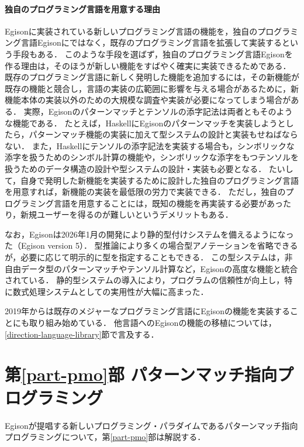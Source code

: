 \begin{oframed}
  \paragraph{独自のプログラミング言語を用意する理由}
Egisonに実装されている新しいプログラミング言語の機能を，独自のプログラミング言語Egisonにではなく，既存のプログラミング言語を拡張して実装するという手段もある．
このような手段を選ばず，独自のプログラミング言語Egisonを作る理由は，そのほうが新しい機能をすばやく確実に実装できるためである．
既存のプログラミング言語に新しく発明した機能を追加するには，その新機能が既存の機能と競合し，言語の実装の広範囲に影響を与える場合があるために，新機能本体の実装以外のための大規模な調査や実装が必要になってしまう場合がある．
実際，Egisonのパターンマッチとテンソルの添字記法は両者ともそのような機能である．
たとえば，HaskellにEgisonのパターンマッチを実装しようとしたら，パターンマッチ機能の実装に加えて型システムの設計と実装もせねばならない．
また，Haskellにテンソルの添字記法を実装する場合も，シンボリックな添字を扱うためのシンボル計算の機能や，シンボリックな添字をもつテンソルを扱うためのデータ構造の設計や型システムの設計・実装も必要となる．
たいして，自身で発明した新機能を実装するために設計した独自のプログラミング言語を用意すれば，新機能の実装を最低限の労力で実装できる．
ただし，独自のプログラミング言語を用意することには，既知の機能を再実装する必要があったり，新規ユーザーを得るのが難しいというデメリットもある．

なお，Egisonは2026年1月の開発により静的型付けシステムを備えるようになった（Egison version 5）．
型推論により多くの場合型アノテーションを省略できるが，必要に応じて明示的に型を指定することもできる．
この型システムは，非自由データ型のパターンマッチやテンソル計算など，Egisonの高度な機能と統合されている．
静的型システムの導入により，プログラムの信頼性が向上し，特に数式処理システムとしての実用性が大幅に高まった．

2019年からは既存のメジャーなプログラミング言語にEgisonの機能を実装することにも取り組み始めている．
他言語へのEgisonの機能の移植については，\ref{direction-language-library}節で言及する．
\end{oframed}

\section{第\ref{part-pmo}部 パターンマッチ指向プログラミング}\label{intro-pmo}

Egisonが提唱する新しいプログラミング・パラダイムであるパターンマッチ指向プログラミングについて，第\ref{part-pmo}部は解説する．

